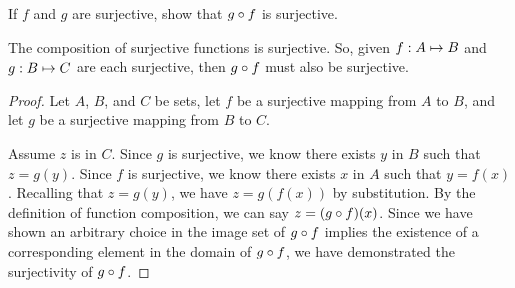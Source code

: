 \documentclass[main.tex]{subfiles}
\begin{document}
\subproblem{}\label{s2p4d}

If \(f\) and \(g\) are surjective, show that \({g} \circ{} {f}\) is surjective.

\begin{thm}
	The composition of surjective functions is surjective. So, given
	\({f}: {A} \mapsto{} {B}\) and \({g}: {B} \mapsto{} {C}\) are each surjective,
	then \({g} \circ{} {f}\) must also be surjective.
\end{thm}
\begin{proof}
	Let \(A\), \(B\), and \(C\) be sets, let \(f\) be a surjective mapping
	from \(A\) to \(B\), and let \(g\) be a surjective mapping from \(B\) to
	\(C\).

	Assume \(z\) is in \(C\). Since \(g\) is surjective, we know there
	exists \(y\) in \(B\) such that \(z = g(y)\). Since \(f\) is surjective,
	we know there exists \(x\) in \(A\) such that \(y = f(x)\). Recalling
	that \(z = g(y)\), we have \(z = g(f(x))\) by substitution. By the
	definition of function composition, we can say
	\(z = ({g} \circ{} {f})(x)\). Since we have shown an arbitrary choice in
	the image set of \({g} \circ{} {f}\) implies the existence of a
	corresponding element in the domain of \({g} \circ{} {f}\), we have
	demonstrated the surjectivity of \({g} \circ{} {f}\).
\end{proof}
\end{document}
